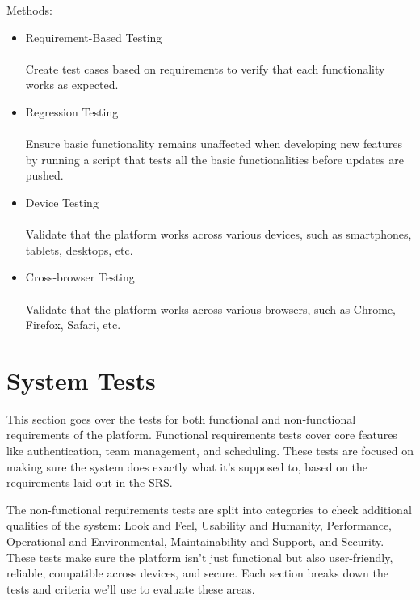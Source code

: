 \documentclass[12pt, titlepage]{article}
\begin{document}
Methods: \\

\begin{itemize}
    \item Requirement-Based Testing
          \\ \\ Create test cases based on requirements to verify that each functionality works as expected.

    \item Regression Testing
          \\ \\ Ensure basic functionality remains unaffected when developing new features by running a script that tests all the basic functionalities before updates are pushed.

    \item Device Testing
          \\ \\ Validate that the platform works across various devices, such as smartphones, tablets, desktops, etc.

    \item Cross-browser Testing
          \\ \\ Validate that the platform works across various browsers,
          such as Chrome, Firefox, Safari, etc.

\end{itemize}

\section{System Tests}

This section goes over the tests for both functional and non-functional requirements of the platform. Functional requirements tests cover core features like authentication, team management, and scheduling. These tests are focused on making sure the system does exactly what it's supposed to, based on the requirements laid out in the SRS.

The non-functional requirements tests are split into categories to check additional qualities of the system: Look and Feel, Usability and Humanity, Performance, Operational and Environmental, Maintainability and Support, and Security. These tests make sure the platform isn't just functional but also user-friendly, reliable, compatible across devices, and secure. Each section breaks down the tests and criteria we'll use to evaluate these areas.
\end{document}
